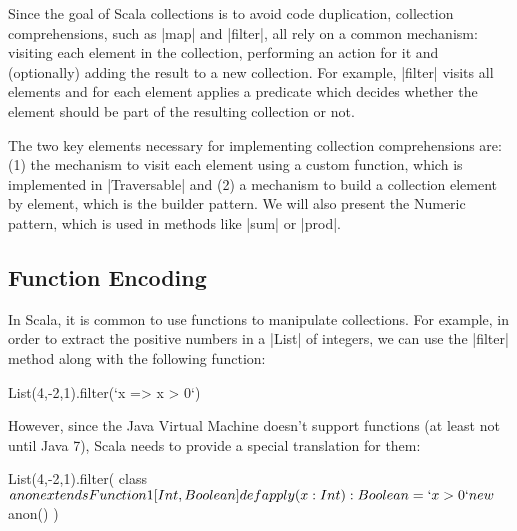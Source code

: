 
Since the goal of Scala collections is to avoid code duplication, collection comprehensions, such as |map| and |filter|, all rely on a common mechanism: visiting each element in the collection, performing an action for it and (optionally) adding the result to a new collection. For example, |filter| visits all elements and for each element applies a predicate which decides whether the element should be part of the resulting collection or not.

The two key elements necessary for implementing collection comprehensions are: (1) the mechanism to visit each element using a custom function, which is implemented in |Traversable| and (2) a mechanism to build a collection element by element, which is the builder pattern. We will also present the Numeric pattern, which is used in methods like |sum| or |prod|.

\subsection{Function Encoding}

In Scala, it is common to use functions to manipulate collections. For example, in order to extract the positive numbers in a |List| of integers, we can use the |filter| method along with the following function:

\begin{lstlisting-nobreak}
 List(4,-2,1).filter(`x => x > 0`)
\end{lstlisting-nobreak}

However, since the Java Virtual Machine doesn't support functions (at least not until Java 7), Scala needs to provide a special translation for them:

\begin{lstlisting-nobreak}
 List(4,-2,1).filter({
     class $anon extends Function1[Int, Boolean] {
       def apply(x: Int): Boolean = `x > 0`
     }
     new $anon()
   })
\end{lstlisting-nobreak}

